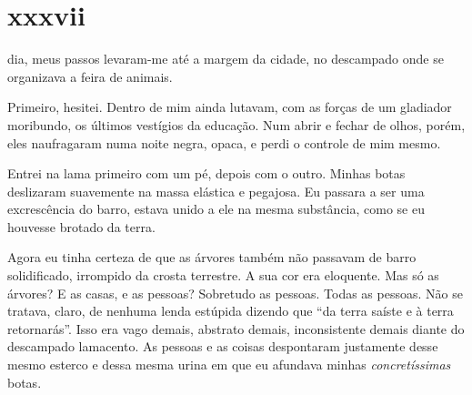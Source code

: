 


\section{xxxvii} 

 dia, meus passos levaram-me até a margem da cidade, no
 descampado onde se organizava a feira de animais.


Primeiro, hesitei. Dentro de mim ainda lutavam, com as forças de um gladiador
moribundo, os últimos vestígios da educação. Num abrir e fechar de olhos,
porém, eles naufragaram numa noite negra, opaca, e perdi o controle de mim
mesmo.

Entrei na lama primeiro com um pé, depois com o outro. Minhas botas deslizaram
suavemente na massa elástica e pegajosa. Eu passara a ser uma excrescência do
barro, estava unido a ele na mesma substância, como se eu houvesse brotado da
terra.

Agora eu tinha certeza de que as árvores também não passavam de barro
solidificado, irrompido da crosta terrestre. A sua cor era eloquente. Mas só
as árvores? E as casas, e as pessoas? Sobretudo as pessoas. Todas as pessoas.
Não se tratava, claro, de nenhuma lenda estúpida dizendo que ``da terra
saíste e à terra retornarás''. Isso era vago demais, abstrato demais,
inconsistente demais diante do descampado lamacento. As pessoas e as coisas
despontaram justamente desse mesmo esterco e dessa mesma urina em que eu
afundava minhas \textit{concretíssimas} botas.

